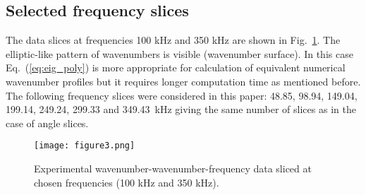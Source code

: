 \documentclass[preprint,12pt]{elsarticle}
\begin{document}
\subsection{Selected frequency slices}
The data slices at frequencies 100 kHz and 350 kHz are shown in Fig.~\ref{fig:freq_slice}. 
The elliptic-like pattern of wavenumbers is visible (wavenumber surface).
In this case Eq.~(\ref{eq:eig_poly}) is more appropriate for calculation of equivalent numerical wavenumber profiles but it requires longer computation time as mentioned before.
The following frequency slices were considered in this paper: 48.85, 98.94, 149.04, 199.14, 249.24, 299.33 and 349.43~kHz giving the same number of slices as in the case of angle slices.
\begin{figure} [h!]
	\centering
	\texttt{[image: figure3.png]}	
	\caption{Experimental wavenumber-wavenumber-frequency data sliced at chosen frequencies (100 kHz and 350 kHz).}
	\label{fig:freq_slice}
\end{figure}
\end{document}
